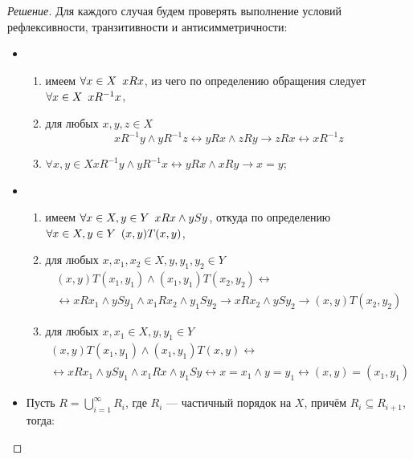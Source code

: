     \begin{proof}[Решение]
        Для каждого случая будем проверять выполнение условий рефлексивности, транзитивности и антисимметричности:
        \begin{itemize}
            \item \begin{enumerate}[label=\arabic{*})]
                \item имеем \(\forall x \in X \enskip x R x \), из чего по определению обращения следует \(\forall x \in X \enskip x R^{-1} x\),
                \item для любых \(x, y, z \in X \) \[
                    x R^{-1} y \land y R^{-1} z \leftrightarrow y R x \land z R y \to z R x \leftrightarrow x R^{-1} z
                \]
                \item \(\forall x, y \in X x R^{-1} y \land y R^{-1} x \leftrightarrow y R x \land x R y \to x = y\);
            \end{enumerate}
            \item \begin{enumerate}[label=\arabic{*})]
                \item имеем \(\forall x \in X, y \in Y \enskip x R x \land y S y\), откуда по определению \(\forall x \in X, y \in Y \enskip (x, y) T (x, y)\),
                \item для любых \(x, x_1, x_2 \in X, y, y_1, y_2 \in Y \)
                \begin{multline*}
                    (x, y) T (x_1, y_1) \land (x_1, y_1) T (x_2, y_2) \leftrightarrow \\
                    \leftrightarrow x R x_1 \land y S y_1 \land x_1 R x_2 \land y_1 S y_2 \to x R x_2 \land y S y_2 \to (x, y) T (x_2, y_2)
                \end{multline*}
                \item для любых \(x, x_1 \in X, y, y_1 \in Y \)
                \begin{multline*}
                    (x, y) T (x_1, y_1) \land (x_1, y_1) T (x, y) \leftrightarrow \\
                    \leftrightarrow x R x_1 \land y S y_1 \land x_1 R x \land y_1 S y \leftrightarrow x = x_1 \land y = y_1 \leftrightarrow (x, y) = (x_1, y_1)
                \end{multline*}
            \end{enumerate}
            \item Пусть \(R = \bigcup_{i=1}^{\infty} R_i\), где \(R_i\) --- частичный порядок на \(X\), причём \(R_i \subseteq R_{i+1}\), тогда:

\end{itemize}
\end{proof}
